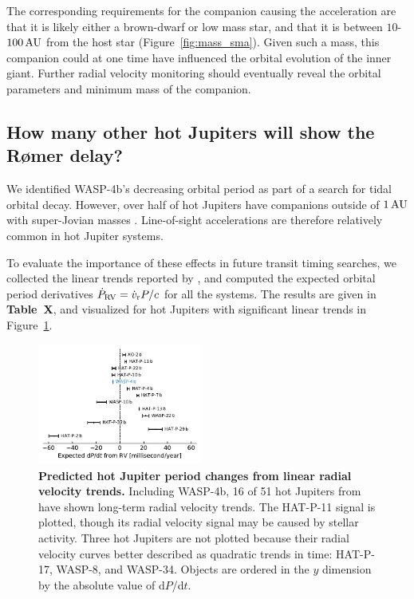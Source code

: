 \documentclass[12pt,twocolumn,tighten]{aastex62}
\begin{document}
The corresponding requirements for the companion causing the
acceleration are that it is likely either a brown-dwarf or low mass
star, and that it is between $10$-$100\,{\rm AU}$ from the host star
(Figure~\ref{fig:mass_sma}).
Given such a mass, this companion could at one time have influenced
the orbital evolution of the inner giant.
Further radial velocity monitoring should eventually reveal the
orbital parameters and minimum mass of the companion.

\subsection{How many other hot Jupiters will show the R{\o}mer delay?}

We identified WASP-4b's decreasing orbital period as part of a search
for tidal orbital decay.  However, over half of hot Jupiters have
companions outside of $1\,{\rm AU}$ with super-Jovian masses
\citep{knutson_friends_2014}.  Line-of-sight accelerations are
therefore relatively common in hot Jupiter systems. 

To evaluate the importance of these effects in future transit timing
searches, we collected the linear trends reported by
\citet{knutson_friends_2014}, and computed the expected orbital period
derivatives $\dot{P}_{\rm RV} = \dot{v}_{\rm r} P/c$ for all the
systems.
The results are given in {\bf Table~X}, and visualized for hot
Jupiters with significant linear trends in Figure~\ref{fig:pdot_pop}.

\begin{figure}[t]
	\begin{center}
		\leavevmode
		\includegraphics[width=0.48\textwidth]{f5.pdf}
	\end{center}
	\vspace{-0.7cm}
	\caption{
  {\bf Predicted hot Jupiter period changes from linear radial
  velocity trends.} Including WASP-4b, 16 of 51 hot Jupiters from
  \citet{knutson_friends_2014} have shown long-term radial velocity
  trends.  The HAT-P-11 signal is plotted, though its radial velocity
  signal may be caused by stellar activity.  Three hot Jupiters are
  not plotted because their radial velocity curves better described as
  quadratic trends in time: HAT-P-17, WASP-8, and WASP-34.  Objects
  are ordered in the $y$ dimension by the absolute value of d$P$/d$t$.
	\label{fig:pdot_pop}
  \vspace{-0.3cm}
	}
\end{figure}
\end{document}
